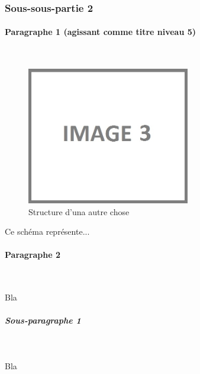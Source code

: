 \subsubsection{Sous-sous-partie 2}

\paragraph{Paragraphe 1 (agissant comme titre niveau 5)}
~\\
\hskip7mm

\begin{figure}[!ht]
\begin{center}
\includegraphics[height=6cm]{autre_partie/image3}
\end{center}
\caption[Structure d'una autre chose]{Structure d'una autre chose\protect\footnotemark}
\end{figure}

Ce schéma représente...



\paragraph{Paragraphe 2}
~\\
\hskip7mm


Bla

\subparagraph{Sous-paragraphe 1}
~\\
\hskip7mm

Bla

